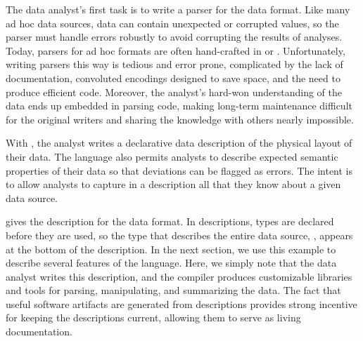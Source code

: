 The data analyst's first task is to write a parser for the
\dibbler{} data  format.  Like many ad hoc data sources, \dibbler{} data
can contain unexpected or corrupted values, so the
parser must handle errors robustly to avoid corrupting the results of
analyses.  Today, parsers for ad hoc formats are often hand-crafted in 
\perl{} or \C{}.  Unfortunately, writing parsers this way is tedious and
error prone, complicated by the lack of documentation, convoluted
encodings designed to save space, and the need to produce efficient
code.  Moreover, the analyst's hard-won understanding of the data ends
up embedded in parsing code, making long-term maintenance difficult
for the original writers and sharing the knowledge with others nearly
impossible.

With \pads{}, the analyst writes a declarative data description of the
physical layout of their data.  The language also permits analysts to
describe expected semantic properties of their data so that deviations
can be flagged as errors. The intent is to allow analysts to capture
in a \pads{} description all that they know about a given data source.

 gives the \pads{} description for the
\dibbler{} data format.  In \pads{} descriptions, types are declared
before they are used, so the type that describes the entire data
source, , appears at the bottom of the description.  In
the next section, we use this example to describe several features of
the \pads{} language.  Here, we simply note that the data analyst
writes this description, and the \pads{} compiler produces
customizable \C{} libraries and tools for parsing, manipulating, and
summarizing the data.  The fact that useful software artifacts are
generated from \pads{} descriptions provides strong incentive for
keeping the descriptions current, allowing them to serve as living
documentation.

